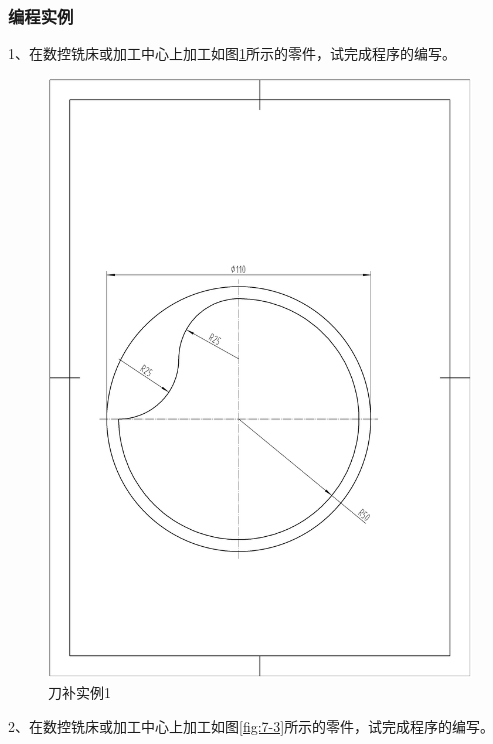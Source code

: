\subsubsection{编程实例}
1、在数控铣床或加工中心上加工如图\ref{fig:7-2}所示的零件，试完成程序的编写。
\begin{figure}[h]
	\centering
	\includegraphics[width=0.8\linewidth,trim=40 150 70 220,clip]{data/image/7-1.jpg}
	\caption{刀补实例1}
	\label{fig:7-2}
\end{figure}

2、在数控铣床或加工中心上加工如图\ref{fig:7-3}所示的零件，试完成程序的编写。

